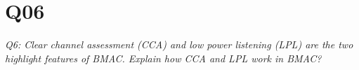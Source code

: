 \chapter{Q06}
\emph{Q6: Clear channel assessment (CCA) and low power listening (LPL) are the
two highlight features of BMAC. Explain how CCA and LPL work in BMAC?}
